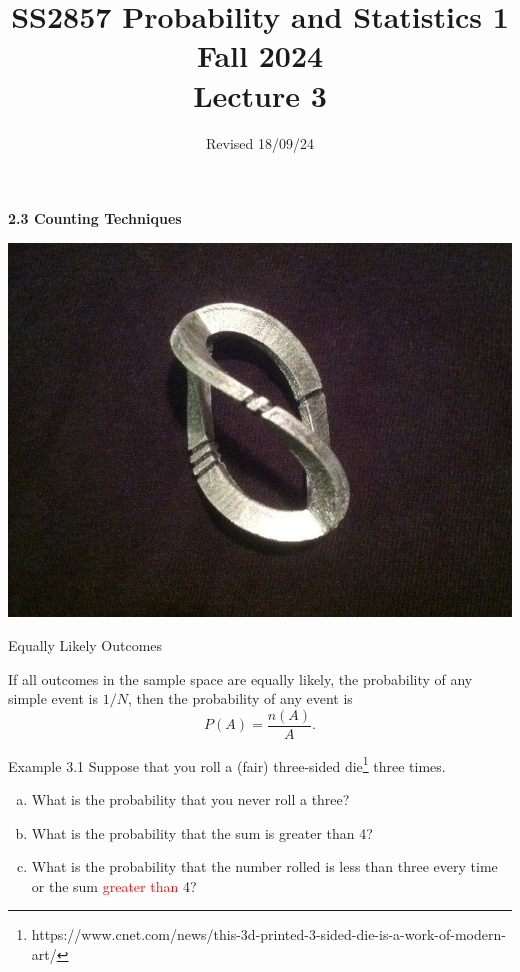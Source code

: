 \documentclass[aspectratio=169,xcolor=pdftex,dvipsnames,table]{beamer}\usepackage[]{graphicx}\usepackage[]{xcolor}
\title[SS2857 -- Lecture 3]{SS2857 Probability and Statistics 1\\
  Fall 2024\\
  \vspace{.2in}
  Lecture 3}
\date{Revised 18/09/24}
\begin{document}
{

\begin{frame}
  \maketitle
\end{frame}
}


\begin{frame}
  \begin{center}
    \Large{\textbf{2.3 Counting Techniques}}

    \includegraphics[height=.6\textheight]{three_sided_die}
  \end{center}
\end{frame}

\begin{frame}{Equally Likely Outcomes}

  If all outcomes in the sample space are equally likely, the probability of any simple event is $1/N$, then the probability of any event is
  \[
    P(A)=\frac{n(A)}{A}.
  \]
  
\end{frame}

\begin{frame}{Example 3.1}
  Suppose that you roll a (fair) three-sided die\footnote{https://www.cnet.com/news/this-3d-printed-3-sided-die-is-a-work-of-modern-art/} three times.

  \medskip

  \begin{enumerate}[a)]
  \item What is the probability that you never roll a three?
  \item What is the probability that the sum is greater than 4?
  \item What is the probability that the number rolled is less than three every time or the sum \textcolor{red}{greater than} 4?
  \end{enumerate}
  
\end{frame}
\end{document}
